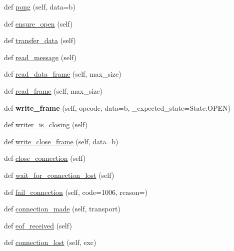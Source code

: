 \begin{DoxyCompactItemize}
\item 
def \hyperlink{classwebsockets_1_1protocol_1_1_web_socket_common_protocol_aaac0bd94a1cf0015cb0aa687daf78676}{pong} (self, data=b\textquotesingle{}\textquotesingle{})
\item 
def \hyperlink{classwebsockets_1_1protocol_1_1_web_socket_common_protocol_a35bfc837fed80493c2196001363cc1d4}{ensure\+\_\+open} (self)
\item 
def \hyperlink{classwebsockets_1_1protocol_1_1_web_socket_common_protocol_a07a6c3c50dd1f87096a3f191780d9c2c}{transfer\+\_\+data} (self)
\item 
def \hyperlink{classwebsockets_1_1protocol_1_1_web_socket_common_protocol_a4de6a491a4d3bb17bdd6ede36c3ad114}{read\+\_\+message} (self)
\item 
def \hyperlink{classwebsockets_1_1protocol_1_1_web_socket_common_protocol_a0736093eb665ea46a97730d255173cb9}{read\+\_\+data\+\_\+frame} (self, max\+\_\+size)
\item 
def \hyperlink{classwebsockets_1_1protocol_1_1_web_socket_common_protocol_a8d8d236293e7897c4574b63f25d65fae}{read\+\_\+frame} (self, max\+\_\+size)
\item 
\mbox{\label{classwebsockets_1_1protocol_1_1_web_socket_common_protocol_a8b560dfc332d9854875a8787c50fafe4}} 
def {\bfseries write\+\_\+frame} (self, opcode, data=b\textquotesingle{}\textquotesingle{}, \+\_\+expected\+\_\+state=State.\+O\+P\+EN)
\item 
def \hyperlink{classwebsockets_1_1protocol_1_1_web_socket_common_protocol_abc8c8138e1b8a415fdfd3996cb1e7196}{writer\+\_\+is\+\_\+closing} (self)
\item 
def \hyperlink{classwebsockets_1_1protocol_1_1_web_socket_common_protocol_a1634532917578e526a294c1c94c81914}{write\+\_\+close\+\_\+frame} (self, data=b\textquotesingle{}\textquotesingle{})
\item 
def \hyperlink{classwebsockets_1_1protocol_1_1_web_socket_common_protocol_ab93f2de9e4d230c3651683245140f55a}{close\+\_\+connection} (self)
\item 
def \hyperlink{classwebsockets_1_1protocol_1_1_web_socket_common_protocol_a0da1c941470085c421ae779bbfef40bb}{wait\+\_\+for\+\_\+connection\+\_\+lost} (self)
\item 
def \hyperlink{classwebsockets_1_1protocol_1_1_web_socket_common_protocol_a618b79d4fa0be44b89561f8abab709e1}{fail\+\_\+connection} (self, code=1006, reason=\textquotesingle{}\textquotesingle{})
\item 
def \hyperlink{classwebsockets_1_1protocol_1_1_web_socket_common_protocol_a8b650d7fe663c9465e7fc027689cad4e}{connection\+\_\+made} (self, transport)
\item 
def \hyperlink{classwebsockets_1_1protocol_1_1_web_socket_common_protocol_a10b5889a53c9bbb91fe209627c321297}{eof\+\_\+received} (self)
\item 
def \hyperlink{classwebsockets_1_1protocol_1_1_web_socket_common_protocol_a726b03e5dfb763929cd619a768b7acd0}{connection\+\_\+lost} (self, exc)
\end{DoxyCompactItemize}
